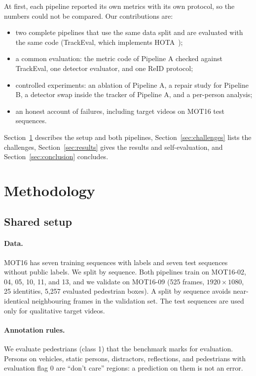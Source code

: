 \documentclass[11pt,letterpaper]{article}
\begin{document}
At first, each pipeline reported its own metrics with its own protocol, so the numbers could not be compared.
Our contributions are:
\begin{itemize}
\item two complete pipelines that use the same data split and are evaluated with the same code (TrackEval, which implements HOTA~\cite{luiten2021hota});
\item a common evaluation: the metric code of Pipeline A checked against TrackEval, one detector evaluator, and one ReID protocol;
\item controlled experiments: an ablation of Pipeline A, a repair study for Pipeline B, a detector swap inside the tracker of Pipeline A, and a per-person analysis;
\item an honest account of failures, including target videos on MOT16 test sequences.
\end{itemize}
Section~\ref{sec:method} describes the setup and both pipelines, Section~\ref{sec:challenges} lists the challenges, Section~\ref{sec:results} gives the results and self-evaluation, and Section~\ref{sec:conclusion} concludes.

\section{Methodology}\label{sec:method}

\subsection{Shared setup}\label{sec:setup}
\paragraph{Data.}
MOT16 has seven training sequences with labels and seven test sequences without public labels.
We split by sequence.
Both pipelines train on MOT16-02, 04, 05, 10, 11, and 13, and we validate on MOT16-09 (525 frames, $1920\times1080$, 25 identities, 5,257 evaluated pedestrian boxes).
A split by sequence avoids near-identical neighbouring frames in the validation set.
The test sequences are used only for qualitative target videos.

\paragraph{Annotation rules.}
We evaluate pedestrians (class 1) that the benchmark marks for evaluation.
Persons on vehicles, static persons, distractors, reflections, and pedestrians with evaluation flag 0 are ``don't care'' regions: a prediction on them is not an error.
\end{document}
